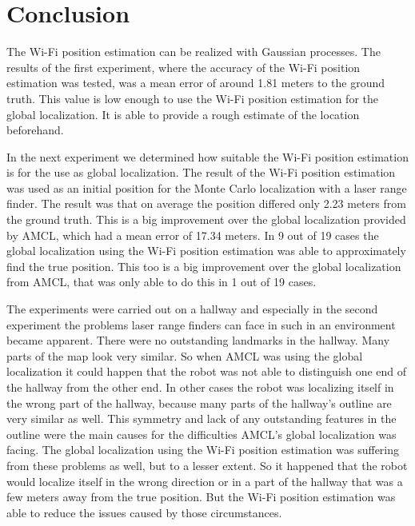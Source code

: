 \chapter{Conclusion} %
\label{Chapter5}
The Wi-Fi position estimation can be realized with Gaussian processes. The results of the first experiment, where the accuracy of the Wi-Fi position estimation was tested, was a mean error of around 1.81 meters to the ground truth. This value is low enough to use the Wi-Fi position estimation for the global localization. It is able to provide a rough estimate of the location beforehand. 

In the next experiment we determined how suitable the Wi-Fi position estimation is for the use as global localization. The result of the Wi-Fi position estimation was used as an initial position for the Monte Carlo localization with a laser range finder. The result was that on average the position differed only 2.23 meters from the ground truth. This is a big improvement over the global localization provided by AMCL, which had a mean error of 17.34 meters. In 9 out of 19 cases the global localization using the Wi-Fi position estimation was able to approximately find the true position. This too is a big improvement over the global localization from AMCL, that was only able to do this in 1 out of 19 cases. 

The experiments were carried out on a hallway and especially in the second experiment the problems laser range finders can face in such in an environment became apparent. There were no outstanding landmarks in the hallway. Many parts of the map look very similar. So when AMCL was using the global localization it could happen that the robot was not able to distinguish one end of the hallway from the other end. In other cases the robot was localizing itself in the wrong part of the hallway, because many parts of the hallway's outline are very similar as well. This symmetry and lack of any outstanding features in the outline were the main causes for the difficulties AMCL's global localization was facing. The global localization using the Wi-Fi position estimation was suffering from these problems as well, but to a lesser extent. So it happened that the robot would localize itself in the wrong direction or in a part of the hallway that was a few meters away from the true position. But the Wi-Fi position estimation was able to reduce the issues caused by those circumstances.

